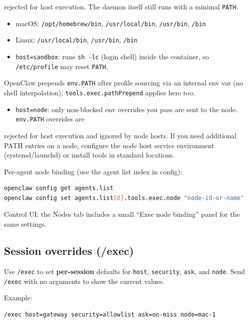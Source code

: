 rejected for host execution. The daemon itself still runs with a minimal \texttt{PATH}:
\begin{itemize}
  \item macOS: \texttt{/opt/homebrew/bin}, \texttt{/usr/local/bin}, \texttt{/usr/bin}, \texttt{/bin}
  \item Linux: \texttt{/usr/local/bin}, \texttt{/usr/bin}, \texttt{/bin}
  \item \texttt{host=sandbox}: runs \texttt{sh -lc} (login shell) inside the container, so \texttt{/etc/profile} may reset \texttt{PATH}.
\end{itemize}

OpenClaw prepends \texttt{env.PATH} after profile sourcing via an internal env var (no shell interpolation);
\texttt{tools.exec.pathPrepend} applies here too.
\begin{itemize}
  \item \texttt{host=node}: only non-blocked env overrides you pass are sent to the node. \texttt{env.PATH} overrides are
\end{itemize}

rejected for host execution and ignored by node hosts. If you need additional PATH entries on a node,
configure the node host service environment (systemd/launchd) or install tools in standard locations.

Per-agent node binding (use the agent list index in config):

\begin{lstlisting}[language=bash]
openclaw config get agents.list
openclaw config set agents.list[0].tools.exec.node "node-id-or-name"
\end{lstlisting}


Control UI: the Nodes tab includes a small “Exec node binding” panel for the same settings.

\subsection{Session overrides (/exec)}


Use \texttt{/exec} to set \textbf{per-session} defaults for \texttt{host}, \texttt{security}, \texttt{ask}, and \texttt{node}.
Send \texttt{/exec} with no arguments to show the current values.

Example:

\begin{lstlisting}
/exec host=gateway security=allowlist ask=on-miss node=mac-1
\end{lstlisting}


